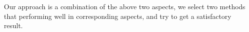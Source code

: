 \documentclass[10pt,twocolumn,letterpaper]{article}
\begin{document}
    Our approach is a combination of the above two aspects, we select two methods that performing well in corresponding aspects, and try to get a satisfactory result.




\end{document}
